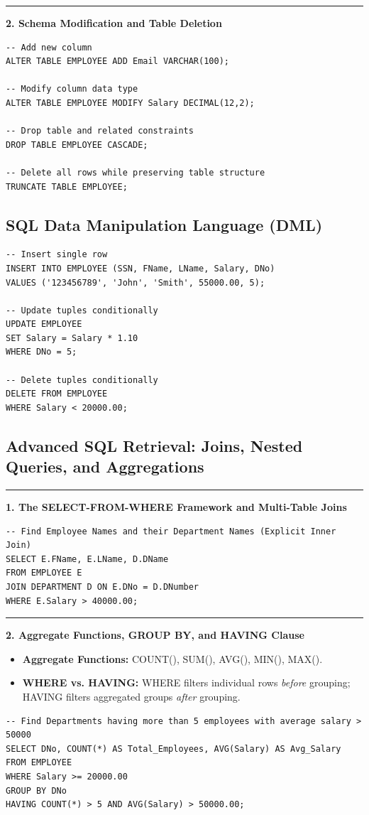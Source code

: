 \documentclass[11pt,a4paper]{article}
\newcommand{\ic}[1]{\mbox{\colorbox{AnthCodeBG}{\footnotesize\ttfamily\textcolor{AnthBlue}{#1}}}}
\newcommand{\concept}[1]{%
  \vspace{3pt}\noindent\textcolor{AnthGreen}{\rule{3.5pt}{10pt}}\enspace
  \textbf{\sffamily\color{AnthDark}#1}\par\vspace{2pt}%
}
\begin{document}
\concept{2. Schema Modification and Table Deletion}
\begin{lstlisting}
-- Add new column
ALTER TABLE EMPLOYEE ADD Email VARCHAR(100);

-- Modify column data type
ALTER TABLE EMPLOYEE MODIFY Salary DECIMAL(12,2);

-- Drop table and related constraints
DROP TABLE EMPLOYEE CASCADE;

-- Delete all rows while preserving table structure
TRUNCATE TABLE EMPLOYEE;
\end{lstlisting}

\subsection{SQL Data Manipulation Language (DML)}

\begin{lstlisting}
-- Insert single row
INSERT INTO EMPLOYEE (SSN, FName, LName, Salary, DNo) 
VALUES ('123456789', 'John', 'Smith', 55000.00, 5);

-- Update tuples conditionally
UPDATE EMPLOYEE 
SET Salary = Salary * 1.10 
WHERE DNo = 5;

-- Delete tuples conditionally
DELETE FROM EMPLOYEE 
WHERE Salary < 20000.00;
\end{lstlisting}

\subsection{Advanced SQL Retrieval: Joins, Nested Queries, and Aggregations}

\concept{1. The SELECT-FROM-WHERE Framework and Multi-Table Joins}
\begin{lstlisting}
-- Find Employee Names and their Department Names (Explicit Inner Join)
SELECT E.FName, E.LName, D.DName 
FROM EMPLOYEE E 
JOIN DEPARTMENT D ON E.DNo = D.DNumber 
WHERE E.Salary > 40000.00;
\end{lstlisting}

\concept{2. Aggregate Functions, GROUP BY, and HAVING Clause}
\begin{itemize}
  \item \textbf{Aggregate Functions:} \ic{COUNT()}, \ic{SUM()}, \ic{AVG()}, \ic{MIN()}, \ic{MAX()}.
  \item \textbf{WHERE vs. HAVING:} \ic{WHERE} filters individual rows \emph{before} grouping; \ic{HAVING} filters aggregated groups \emph{after} grouping.
\end{itemize}
\begin{lstlisting}
-- Find Departments having more than 5 employees with average salary > 50000
SELECT DNo, COUNT(*) AS Total_Employees, AVG(Salary) AS Avg_Salary 
FROM EMPLOYEE 
WHERE Salary >= 20000.00 
GROUP BY DNo 
HAVING COUNT(*) > 5 AND AVG(Salary) > 50000.00;
\end{lstlisting}
\end{document}
